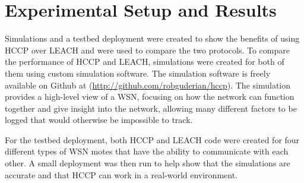 \chapter{Experimental Setup and Results}
\label{ch:expresults}


Simulations and a testbed deployment were created to show the benefits of using HCCP over LEACH
and were used to compare the two protocols. 
To compare the performance of HCCP and LEACH, simulations were created for both of them using custom
simulation software. The simulation software is freely available on Github at (\url{http://github.com/robguderian/hccp}).
The simulation provides a high-level view of a WSN, focusing on  
how the network can function together and give insight into the network, allowing 
many different factors to be logged that would otherwise be impossible to track.

For the testbed deployment, both HCCP and LEACH code were created for four 
different types of WSN motes that have the ability to communicate with 
each other. A small deployment was then run to help show that 
the simulations are accurate and that HCCP can work
in a real-world environment.

